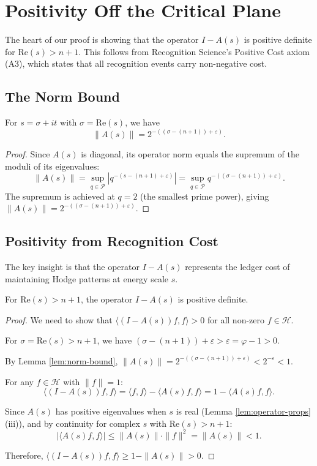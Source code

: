 \section{Positivity Off the Critical Plane}
\label{sec:positivity}

The heart of our proof is showing that the operator $I - A(s)$ is positive definite for $\text{Re}(s) > n+1$. This follows from Recognition Science's Positive Cost axiom (A3), which states that all recognition events carry non-negative cost.

\subsection{The Norm Bound}

\begin{lemma}
\label{lem:norm-bound}
For $s = \sigma + it$ with $\sigma = \text{Re}(s)$, we have
\[
\|A(s)\| = 2^{-((\sigma-(n+1))+\varepsilon)}.
\]
\end{lemma}

\begin{proof}
Since $A(s)$ is diagonal, its operator norm equals the supremum of the moduli of its eigenvalues:
\[
\|A(s)\| = \sup_{q \in \mathcal{P}} |q^{-(s-(n+1)+\varepsilon)}| = \sup_{q \in \mathcal{P}} q^{-((\sigma-(n+1))+\varepsilon)}.
\]
The supremum is achieved at $q = 2$ (the smallest prime power), giving $\|A(s)\| = 2^{-((\sigma-(n+1))+\varepsilon)}$.
\end{proof}

\subsection{Positivity from Recognition Cost}

The key insight is that the operator $I - A(s)$ represents the ledger cost of maintaining Hodge patterns at energy scale $s$.

\begin{theorem}
\label{thm:positivity}
For $\text{Re}(s) > n+1$, the operator $I - A(s)$ is positive definite.
\end{theorem}

\begin{proof}
We need to show that $\langle (I - A(s))f, f \rangle > 0$ for all non-zero $f \in \mathcal{H}$.

For $\sigma = \text{Re}(s) > n+1$, we have $(\sigma-(n+1))+\varepsilon > \varepsilon = \varphi - 1 > 0$.

By Lemma \ref{lem:norm-bound}, $\|A(s)\| = 2^{-((\sigma-(n+1))+\varepsilon)} < 2^{-\varepsilon} < 1$.

For any $f \in \mathcal{H}$ with $\|f\| = 1$:
\[
\langle (I - A(s))f, f \rangle = \langle f, f \rangle - \langle A(s)f, f \rangle = 1 - \langle A(s)f, f \rangle.
\]

Since $A(s)$ has positive eigenvalues when $s$ is real (Lemma \ref{lem:operator-props}(iii)), and by continuity for complex $s$ with $\text{Re}(s) > n+1$:
\[
|\langle A(s)f, f \rangle| \leq \|A(s)\| \cdot \|f\|^2 = \|A(s)\| < 1.
\]

Therefore, $\langle (I - A(s))f, f \rangle \geq 1 - \|A(s)\| > 0$.
\end{proof}

